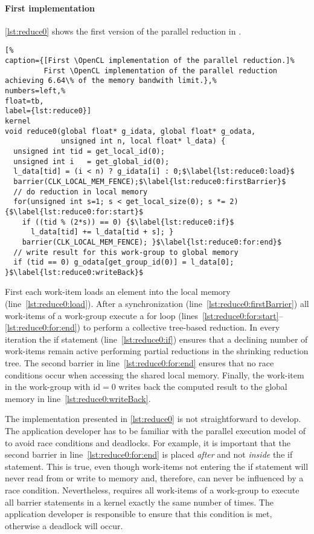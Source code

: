 \paragraph{First \OpenCL implementation}
\autoref{lst:reduce0} shows the first version of the parallel reduction in \OpenCL.
%
\begin{lstlisting}[%
caption={[First \OpenCL implementation of the parallel reduction.]%
         First \OpenCL implementation of the parallel reduction achieving 6.64\% of the memory bandwith limit.},%
numbers=left,%
float=tb,
label={lst:reduce0}]
kernel
void reduce0(global float* g_idata, global float* g_odata,
             unsigned int n, local float* l_data) {
  unsigned int tid = get_local_id(0);
  unsigned int i   = get_global_id(0);
  l_data[tid] = (i < n) ? g_idata[i] : 0;$\label{lst:reduce0:load}$
  barrier(CLK_LOCAL_MEM_FENCE);$\label{lst:reduce0:firstBarrier}$
  // do reduction in local memory
  for(unsigned int s=1; s < get_local_size(0); s *= 2) {$\label{lst:reduce0:for:start}$
    if ((tid % (2*s)) == 0) {$\label{lst:reduce0:if}$
      l_data[tid] += l_data[tid + s]; }
    barrier(CLK_LOCAL_MEM_FENCE); }$\label{lst:reduce0:for:end}$
  // write result for this work-group to global memory
  if (tid == 0) g_odata[get_group_id(0)] = l_data[0]; }$\label{lst:reduce0:writeBack}$
\end{lstlisting}
First each work-item loads an element into the local memory (line~\ref{lst:reduce0:load}).
After a synchronization (line~\ref{lst:reduce0:firstBarrier}) all work-items of a work-group execute a for loop (lines~\ref{lst:reduce0:for:start}--\ref{lst:reduce0:for:end}) to perform a collective tree-based reduction.
In every iteration the if statement (line~\ref{lst:reduce0:if}) ensures that a declining number of work-items remain active performing partial reductions in the shrinking reduction tree.
The second barrier in line~\ref{lst:reduce0:for:end} ensures that no race conditions occur when accessing the shared local memory.
Finally, the work-item in the work-group with id$=0$ writes back the computed result to the global memory in line~\ref{lst:reduce0:writeBack}.


The implementation presented in \autoref{lst:reduce0} is not straightforward to develop.
The application developer has to be familiar with the parallel execution model of \OpenCL to avoid race conditions and deadlocks.
For example, it is important that the second barrier in line~\ref{lst:reduce0:for:end} is placed \emph{after} and not \emph{inside} the if statement.
This is true, even though work-items not entering the if statement will never read from or write to memory and, therefore, can never be influenced by a race condition.
Nevertheless, \OpenCL requires all work-items of a work-group to execute all barrier statements in a kernel exactly the same number of times.
The application developer is responsible to ensure that this condition is met, otherwise a deadlock will occur.

